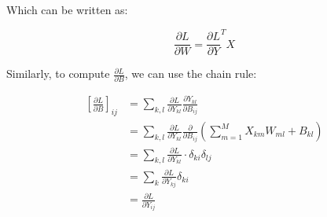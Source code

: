 \documentclass{article}
\begin{document}
Which can be written as:


\begin{equation}
    \frac{\partial L}{\partial W} = \frac{\partial L}{\partial Y}^T X
\end{equation}



Similarly, to compute $\frac{\partial L}{\partial B}$, we can use the chain rule:

\begin{align*}
    \left[ \frac{\partial L}{\partial B} \right]_{ij} &= \sum_{k, l} \frac{\partial L}{\partial Y_{kl}} \frac{\partial Y_{kl}}{\partial B_{ij}} \\
    &= \sum_{k, l} \frac{\partial L}{\partial Y_{kl}} \frac{\partial}{\partial B_{ij}} \left( \sum_{m=1}^{M} X_{km} W_{ml} + B_{kl} \right) \\
    &= \sum_{k, l} \frac{\partial L}{\partial Y_{kl}} \cdot \delta_{ki} \delta_{lj} \\
    &= \sum_{k} \frac{\partial L}{\partial Y_{kj}} \delta_{ki} \\ 
    &= \frac{\partial L}{\partial Y_{ij}}
\end{align*}
\end{document}
